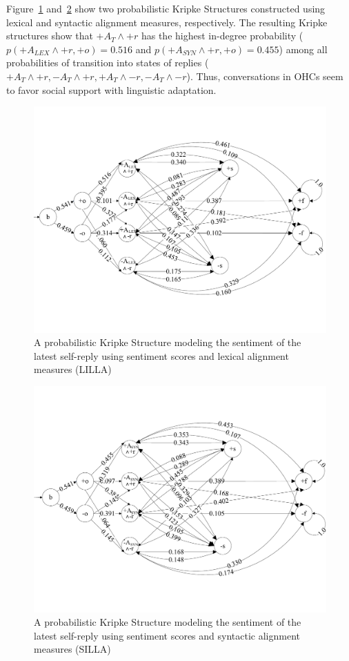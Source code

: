 Figure~\ref{fig:PCTL_Lex} and~\ref{fig:PCTL_Syn} show two probabilistic Kripke Structures constructed using lexical and syntactic alignment measures, respectively. The resulting Kripke structures show that $+A_T\wedge+r$ has the highest in-degree probability ($p(+A_{LEX}\wedge+r,+o)=0.516$ and $p(+A_{SYN}\wedge+r,+o)=0.455$) among all  probabilities of transition into states of replies ($+A_T\wedge+r,-A_T\wedge+r,+A_T\wedge-r,-A_T\wedge-r$). Thus, conversations in OHCs seem to favor social support with linguistic adaptation.

\begin{figure}[!htb]
 \centering
  \includegraphics[width=0.99\linewidth]{Figures/model_lex.pdf}
  \caption{A probabilistic Kripke Structure modeling the sentiment of the latest self-reply using sentiment scores and lexical alignment measures (LILLA)}\label{fig:PCTL_Lex}
  \up
\end{figure}

\begin{figure}[!htb]
 \centering
  \includegraphics[width=0.99\linewidth]{Figures/model_syn.pdf}
  \caption{A probabilistic Kripke Structure modeling the sentiment of the latest self-reply using sentiment scores and syntactic alignment measures (SILLA)}\label{fig:PCTL_Syn}
  \up
\end{figure}


